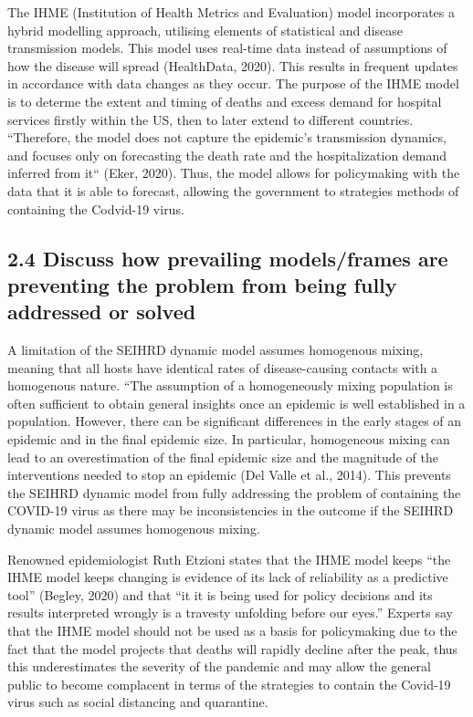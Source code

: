 \documentclass[11pt]{article}
\begin{document}
    The IHME (Institution of Health Metrics and Evaluation) model
incorporates a hybrid modelling approach, utilising elements of
statistical and disease transmission models. This model uses real-time
data instead of assumptions of how the disease will spread (HealthData,
2020). This results in frequent updates in accordance with data changes
as they occur. The purpose of the IHME model is to determe the extent
and timing of deaths and excess demand for hospital services firstly
within the US, then to later extend to different countries. ``Therefore,
the model does not capture the epidemic's transmission dynamics, and
focuses only on forecasting the death rate and the hospitalization
demand inferred from it`` (Eker, 2020). Thus, the model allows for
policymaking with the data that it is able to forecast, allowing the
government to strategies methods of containing the Codvid-19 virus.

    \hypertarget{discuss-how-prevailing-modelsframes-are-preventing-the-problem-from-being-fully-addressed-or-solved}{%
\subsection{2.4 Discuss how prevailing models/frames are preventing the
problem from being fully addressed or
solved}\label{discuss-how-prevailing-modelsframes-are-preventing-the-problem-from-being-fully-addressed-or-solved}}

    A limitation of the SEIHRD dynamic model assumes homogenous mixing,
meaning that all hosts have identical rates of disease-causing contacts
with a homogenous nature. ``The assumption of a homogeneously mixing
population is often sufficient to obtain general insights once an
epidemic is well established in a population. However, there can be
significant differences in the early stages of an epidemic and in the
final epidemic size. In particular, homogeneous mixing can lead to an
overestimation of the final epidemic size and the magnitude of the
interventions needed to stop an epidemic (Del Valle et al., 2014). This
prevents the SEIHRD dynamic model from fully addressing the problem of
containing the COVID-19 virus as there may be inconsistencies in the
outcome if the SEIHRD dynamic model assumes homogenous mixing.

    Renowned epidemiologist Ruth Etzioni states that the IHME model keeps
``the IHME model keeps changing is evidence of its lack of reliability
as a predictive tool'' (Begley, 2020) and that ``it it is being used for
policy decisions and its results interpreted wrongly is a travesty
unfolding before our eyes.'' Experts say that the IHME model should not
be used as a basis for policymaking due to the fact that the model
projects that deaths will rapidly decline after the peak, thus this
underestimates the severity of the pandemic and may allow the general
public to become complacent in terms of the strategies to contain the
Covid-19 virus such as social distancing and quarantine.
\end{document}
